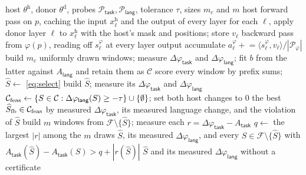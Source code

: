 \documentclass{article}
\theoremstyle{plain}
\theoremstyle{definition}
\theoremstyle{remark}
\newcommand{\host}{\mathrm{h}}
\newcommand{\donor}{\mathrm{d}}
\newcommand{\util}{\mathsf{task}}
\newcommand{\risk}{\mathsf{lang}}
\begin{document}
\begin{algorithm}[t]
\caption{\textsc{Suture}. Lines 2--7 score every layer from one host
forward--backward pass per probe; $s^{\varphi}_\ell$ and $v_\ell$ must come from
the same host pass and probe. Lines 8--9 calibrate the language scores on ten
built windows and choose; later lines build the choice, fall back if the measured
language change violates the constraint, and otherwise certify it.}
\label{alg:suture}
\small
\begin{algorithmic}[1]
 host $\theta^{\host}$, donor $\theta^{\donor}$, probes
$\mathcal{P}_\util,\mathcal{P}_\risk$, tolerance $\tau$, sizes $m_c$ and $m$
\FOR{$\varphi \in \{\varphi_\util, \varphi_\risk\}$ and each $p \in \mathcal{P}_\varphi$}
  \STATE host forward pass on $p$, caching the input $x^{\host}_\ell$ and the output of every layer
  \STATE for each $\ell$, apply donor layer $\ell$ to $x^{\host}_\ell$ with the host's mask and positions; store $v_\ell$ \hfill{}
  \STATE backward pass from $\varphi(p)$, reading off $s^{\varphi}_\ell$ at every layer output
  \STATE accumulate $a^{\varphi}_\ell \mathrel{+}= \langle s^{\varphi}_\ell, v_\ell\rangle / |\mathcal{P}_\varphi|$
\ENDFOR
\STATE build $m_c$ uniformly drawn windows; measure $\Delta\varphi_\util$ and $\Delta\varphi_\risk$; fit $b$ from the latter against $A_\risk$ and retain them as $\mathcal{C}$
\STATE score every window by prefix sums; $\widehat{S}\leftarrow$ \eqref{eq:select}
\STATE build $\widehat{S}$; measure its $\Delta\varphi_\util$ and $\Delta\varphi_\risk$
\IF{$\Delta\varphi_\risk(\widehat{S})<-\tau$}
  \STATE $\mathcal{C}_{\rm feas}\leftarrow\{S\in\mathcal{C}:\Delta\varphi_\risk(S)\ge-\tau\}\cup\{\emptyset\}$; set both host changes to $0$
   the best $\widehat{S}_{\rm fb}\in\mathcal{C}_{\rm feas}$ by measured $\Delta\varphi_\util$, its measured language change, and the violation of $\widehat{S}$
\ELSE
    \STATE build $m$ windows from $\mathcal{F}\setminus\{\widehat{S}\}$; measure each $r=\Delta\varphi_\util-A_\util$
    \STATE $q \leftarrow$ the largest $|r|$ among the $m$ draws
     $\widehat{S}$, its measured $\Delta\varphi_\risk$, and every $S\in\mathcal{F}\setminus\{\widehat{S}\}$ with $A_\util(\widehat{S})-A_\util(S)>q+|r(\widehat{S})|$
  \ELSE
     $\widehat{S}$ and its measured $\Delta\varphi_\risk$ without a certificate
  \ENDIF
\ENDIF
\end{algorithmic}
\end{algorithm}
\end{document}
